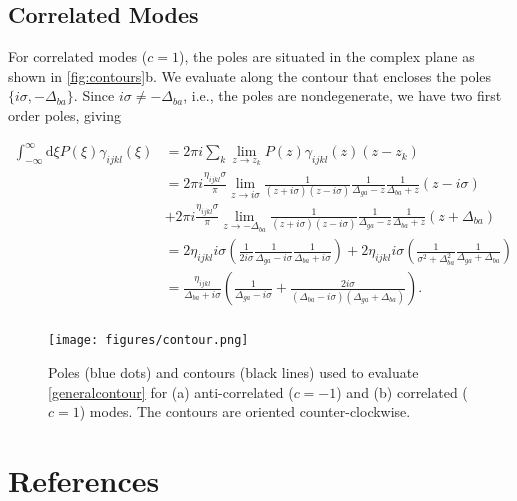 \documentclass[aip, jcp, reprint, onecolumn, nofootinbib]{revtex4-2}
\begin{document}
\subsection{Correlated Modes}
For correlated modes ($c = 1$), the poles are situated in the complex plane as shown in \autoref{fig:contours}b.
We evaluate along the contour that encloses the poles $\{i\sigma, -\Delta_{ba}\}$.
Since $i\sigma \neq -\Delta_{ba}$, i.e., the poles are nondegenerate, we have two first order poles, giving
\begin{widetext}
	\begin{equation}
		\begin{split}
			\int_{-\infty}^\infty \mathrm{d}\xi P(\xi) \gamma_{ijkl}(\xi) &= 2\pi i \sum_k \lim_{z \rightarrow z_k} P(z) \gamma_{ijkl}(z) (z - z_k)\\
			&= 2\pi i \frac{\eta_{ijkl} \sigma}{\pi}  \lim_{z \rightarrow i\sigma} \frac{1}{(z + i\sigma)(z - i\sigma)} \frac{1}{\Delta_{ga} - z} \frac{1}{\Delta_{ba} + z} \left(z - i \sigma\right) \\ 
			&+ 2\pi i \frac{\eta_{ijkl} \sigma}{\pi} \lim_{z \rightarrow -\Delta_{ba}} \frac{1}{(z + i\sigma)(z - i\sigma)} \frac{1}{\Delta_{ga} - z} \frac{1}{\Delta_{ba} + z} \left(z + \Delta_{ba}\right)\\
			&= 2 \eta_{ijkl} i \sigma \left(\frac{1}{2 i \sigma} \frac{1}{\Delta_{ga} - i\sigma} \frac{1}{\Delta_{ba} + i\sigma} \right) + 2\eta_{ijkl} i \sigma \left(\frac{1}{\sigma^2 + \Delta_{ba} ^2} \frac{1}{\Delta_{ga} + \Delta_{ba}} \right)\\
			&= \frac{\eta_{ijkl}}{\Delta_{ba} + i \sigma} \left(\frac{1}{\Delta_{ga} - i \sigma} + \frac{2i\sigma}{(\Delta_{ba} - i \sigma)(\Delta_{ga} + \Delta_{ba})}\right).\\
		\end{split}
	\end{equation}
\end{widetext}


\begin{figure}[!htbp]
	\centering
	\texttt{[image: figures/contour.png]}
	\caption{Poles (blue dots) and contours (black lines) used to evaluate \autoref{generalcontour} for (a) anti-correlated ($c=-1$) and (b) correlated ($c=1$) modes. 
	The contours are oriented counter-clockwise.
	} 
	\label{fig:contours}
\end{figure}

\section{References}

\end{document}
